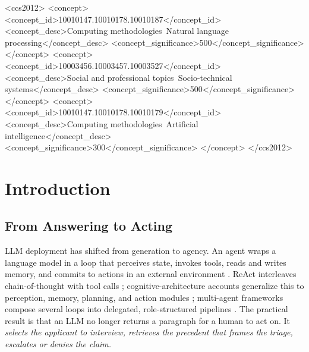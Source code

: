 \documentclass[acmsmall,nonacm]{acmart}
\begin{document}
\begin{abstract}
Table~\ref{tab:benchmarks} shows, no general-purpose benchmark provides demographically instrumented, full-trajectory agent evaluation.
\end{abstract}


\begin{CCSXML}
<ccs2012>
  <concept>
    <concept_id>10010147.10010178.10010187</concept_id>
    <concept_desc>Computing methodologies~Natural language processing</concept_desc>
    <concept_significance>500</concept_significance>
  </concept>
  <concept>
    <concept_id>10003456.10003457.10003527</concept_id>
    <concept_desc>Social and professional topics~Socio-technical systems</concept_desc>
    <concept_significance>500</concept_significance>
  </concept>
  <concept>
    <concept_id>10010147.10010178.10010179</concept_id>
    <concept_desc>Computing methodologies~Artificial intelligence</concept_desc>
    <concept_significance>300</concept_significance>
  </concept>
</ccs2012>
\end{CCSXML}





\maketitle


\section{Introduction}

\subsection{From Answering to Acting}

LLM deployment has shifted from generation to agency. An agent wraps a language model in a loop that perceives state, invokes tools, reads and writes memory, and commits to actions in an external environment \cite{wang2024survey,xi2023rise}. ReAct interleaves chain-of-thought with tool calls \cite{yao2023react}; cognitive-architecture accounts generalize this to perception, memory, planning, and action modules \cite{sumers2024cognitive}; multi-agent frameworks compose several loops into delegated, role-structured pipelines \cite{wu2023autogen,park2023generative}. The practical result is that an LLM no longer returns a paragraph for a human to act on. It \emph{selects the applicant to interview, retrieves the precedent that frames the triage, escalates or denies the claim.}
\end{document}
